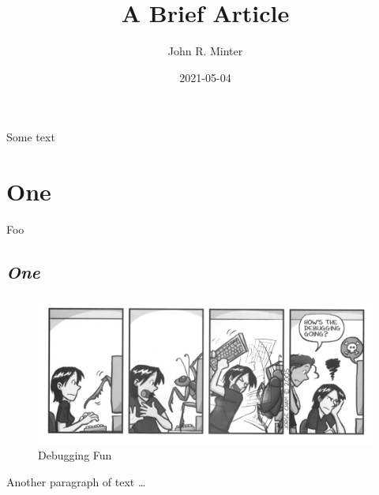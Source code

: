 \documentclass[12pt]{article} %
\title{A Brief Article}
\author{John R. Minter}
\date{2021-05-04} %
\begin{document}
\maketitle


Some text



\section{One}

Foo



\subsection{\emph{One}} %


\begin{figure}[h]
	\centering
	\includegraphics[scale=0.5]{PhD-debugging-sn.png}
	\caption{Debugging Fun}
\end{figure}

Another paragraph of text \ldots
\end{document}
